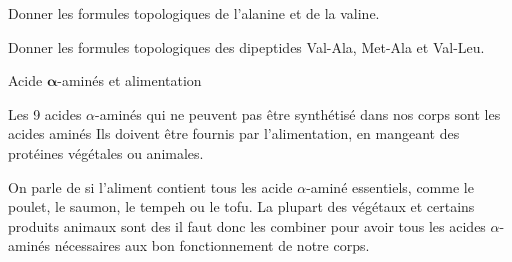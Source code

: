 \schematiser
Donner les formules topologiques de l'alanine et de la valine.
\correction{
  \centering
  \chemfig{!\valine}  \qq{} \chemfig{!\alanine}
}
\pasCorrection{\vspace*{4cm}}

\schematiser
Donner les formules topologiques des dipeptides Val-Ala, Met-Ala et Val-Leu.
\vfill

\begin{doc}{Acide $\mathbf{\alpha}$-aminés et alimentation}
  \begin{importants}
    Les 9 acides $\alpha$-aminés qui ne peuvent pas être synthétisé dans nos corps sont les acides aminés 
    Ils doivent être fournis par l'alimentation, en mangeant des protéines végétales ou animales.
  \end{importants}
  
  On parle de  si l'aliment contient tous les acide $\alpha$-aminé essentiels, comme le poulet, le saumon, le tempeh ou le tofu.
  La plupart des végétaux et certains produits animaux sont des  il faut donc les combiner pour avoir tous les acides $\alpha$-aminés nécessaires aux bon fonctionnement de notre corps.
\end{doc}
